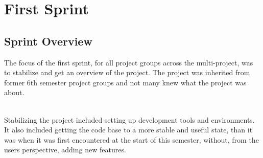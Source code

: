 \chapter{First Sprint}
\label{cha:sprint_1}

\section{Sprint Overview}


The focus of the first sprint, for all project groups across the multi-project, was to stabilize and get an overview of the project. The project was inherited from former 6th semester project groups and not many knew what the \giraf project was about.

\\
Stabilizing the project included setting up development tools and environments. It also included getting the code base to a more stable and useful state, than it was when it was first encountered at the start of this semester, without, from the users perspective, adding new features.  

